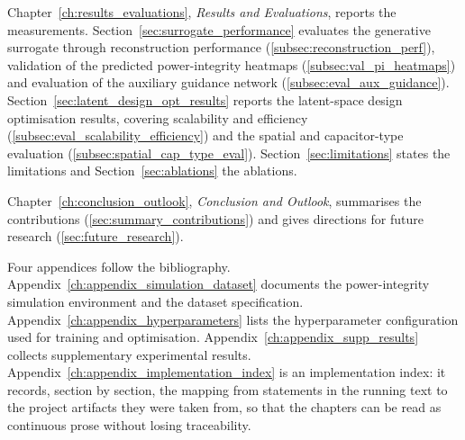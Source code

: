 Chapter~\ref{ch:results_evaluations}, \emph{Results and Evaluations}, reports the measurements.
Section~\ref{sec:surrogate_performance} evaluates the generative surrogate through reconstruction
performance (\ref{subsec:reconstruction_perf}), validation of the predicted power-integrity
heatmaps (\ref{subsec:val_pi_heatmaps}) and evaluation of the auxiliary guidance network
(\ref{subsec:eval_aux_guidance}). Section~\ref{sec:latent_design_opt_results} reports the
latent-space design optimisation results, covering scalability and efficiency
(\ref{subsec:eval_scalability_efficiency}) and the spatial and capacitor-type evaluation
(\ref{subsec:spatial_cap_type_eval}). Section~\ref{sec:limitations} states the limitations and
Section~\ref{sec:ablations} the ablations.

Chapter~\ref{ch:conclusion_outlook}, \emph{Conclusion and Outlook}, summarises the contributions
(\ref{sec:summary_contributions}) and gives directions for future research
(\ref{sec:future_research}).

Four appendices follow the bibliography. Appendix~\ref{ch:appendix_simulation_dataset} documents
the power-integrity simulation environment and the dataset specification.
Appendix~\ref{ch:appendix_hyperparameters} lists the hyperparameter configuration used for training
and optimisation. Appendix~\ref{ch:appendix_supp_results} collects supplementary experimental
results. Appendix~\ref{ch:appendix_implementation_index} is an implementation index: it records,
section by section, the mapping from statements in the running text to the project artifacts they
were taken from, so that the chapters can be read as continuous prose without losing traceability.

